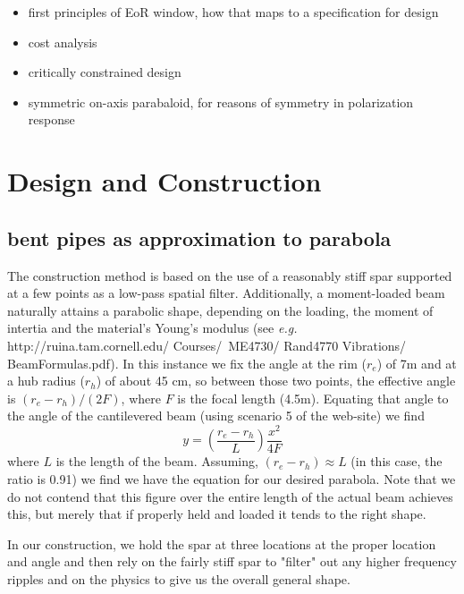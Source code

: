 \documentclass[preprint]{aastex}  %
\begin{document}
\begin{itemize}
\item first principles of EoR window, how that maps to a specification for design
\item cost analysis
\item critically constrained design
\item symmetric on-axis parabaloid, for reasons of symmetry in polarization response
\end{itemize}

\section{Design and Construction}
\label{sec:design}

\subsection{bent pipes as approximation to parabola}
The construction method is based on the use of a reasonably stiff spar supported at a few points as a low-pass spatial filter.  Additionally, a moment-loaded beam naturally attains a parabolic shape, depending on the loading, the moment of intertia and the material's Young's modulus (see {\em e.g.} http://ruina.tam.cornell.edu/ Courses/~ME4730/ Rand4770 Vibrations/ BeamFormulas.pdf).  In this instance we fix the angle at the rim ($r_e$) of 7m and at a hub radius ($r_h$) of about 45 cm, so between those two points, the effective angle is $(r_e-r_h)/(2F)$, where $F$ is the focal length (4.5m).  Equating that angle to the angle of the cantilevered beam (using scenario 5 of the web-site) we find
\begin{equation}
y = \left(\frac{r_e-r_h}{L}\right)\frac{x^2}{4F}
\end{equation}
where $L$ is the length of the beam.
Assuming, $(r_e-r_h) \approx L$ (in this case, the ratio is 0.91) we find we have the equation for our desired parabola.  Note that we do not contend that this figure over the entire length of the actual beam achieves this, but merely that if properly held and loaded it tends to the right shape.

In our construction, we hold the spar at three locations at the proper location and angle and then rely on the fairly stiff spar to "filter" out any higher frequency ripples and on the physics to give us the overall general shape.
\end{document}
